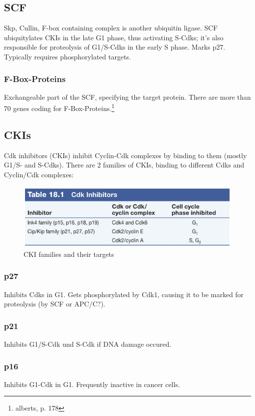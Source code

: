 \documentclass{article}
\begin{document}
	\subsection{SCF}
	Skp, Cullin, F-box containing complex is another ubiquitin ligase. SCF ubiquitylates CKIs in the late G1 phase, thus activating S-Cdks; it's also responsible for proteolysis of G1/S-Cdks in the early S phase. Marks p27. Typically requires phosphorylated targets.
	
	\subsubsection{F-Box-Proteins}
	Exchangeable part of the SCF, specifying the target protein. There are more than 70 genes coding for F-Box-Proteins.\footnote{alberts, p. 178}
	
	\subsection{CKIs}
	Cdk inhibitors (CKIs) inhibit Cyclin-Cdk complexes by binding to them (mostly G1/S- and S-Cdks). There are 2 families of CKIs, binding to different Cdks and Cyclin/Cdk complexes:
	
	\begin{figure}[H]
		\centering
		\includegraphics[width=\linewidth]{ckis_cooper.png}
		\caption{CKI families and their targets}
	\end{figure}

	\subsubsection{p27}
	Inhibits Cdks in G1. Gets phosphorylated by Cdk1, causing it to be marked for proteolysis (by SCF or APC/C?). 
	
	\subsubsection{p21}
	Inhibits G1/S-Cdk und S-Cdk if DNA damage occured.
	
	\subsubsection{p16}
	Inhibits G1-Cdk in G1. Frequently inactive in cancer cells.
	
\end{document}
